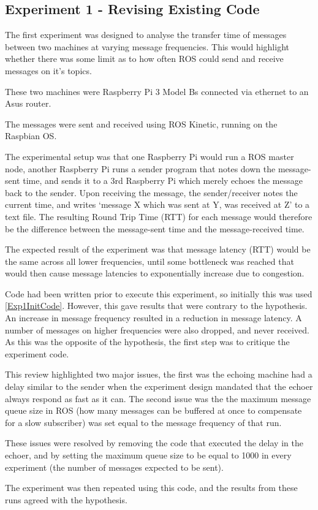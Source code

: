 \documentclass[../dissertation.tex]{subfiles}
\begin{document}
\subsection{Experiment 1 - Revising Existing Code}

The first experiment was designed to analyse the transfer time of messages between two machines at varying message frequencies. This would highlight whether there was some limit as to how often ROS could send and receive messages on it's topics.

These two machines were Raspberry Pi 3 Model Bs connected via ethernet to an Asus router.

The messages were sent and received using ROS Kinetic, running on the Raspbian OS.

The experimental setup was that one Raspberry Pi would run a ROS master node, another Raspberry Pi runs a sender program that notes down the message-sent time, and sends it to a 3rd Raspberry Pi which merely echoes the message back to the sender. Upon receiving the message, the sender/receiver notes the current time, and writes `message X which was sent at Y, was received at Z' to a text file. The resulting Round Trip Time (RTT) for each message would therefore be the difference between the message-sent time and the message-received time.

The expected result of the experiment was that message latency (RTT) would be the same across all lower frequencies, until some bottleneck was reached that would then cause message latencies to exponentially increase due to congestion.

Code had been written prior to execute this experiment, so initially this was used \ref{Exp1InitCode}. However, this gave results that were contrary to the hypothesis. An increase in message frequency resulted in a reduction in message latency. A number of messages on higher frequencies were also dropped, and never received. As this was the opposite of the hypothesis, the first step was to critique the experiment code.

This review highlighted two major issues, the first was the echoing machine had a delay similar to the sender when the experiment design mandated that the echoer always respond as fast as it can. The second issue was the the maximum message queue size in ROS (how many messages can be buffered at once to compensate for a slow subscriber) was set equal to the message frequency of that run.

These issues were resolved by removing the code that executed the delay in the echoer, and by setting the maximum queue size to be equal to 1000 in every experiment (the number of messages expected to be sent).

The experiment was then repeated using this code, and the results from these runs agreed with the hypothesis.
\end{document}
